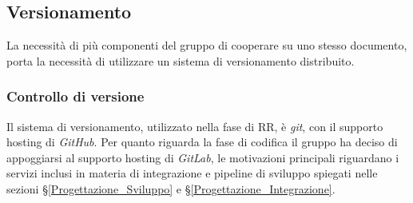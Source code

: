 

\subsection{Versionamento}\label{ProcessiSupporto_Versionamento}
La necessità di più componenti del gruppo di cooperare su uno stesso documento, porta la necessità di utilizzare un sistema di versionamento distribuito. 



\subsubsection{Controllo di versione}
Il sistema di versionamento, utilizzato nella fase di RR, è \textit{git}, con il supporto hosting di \textit{GitHub}. Per quanto riguarda la fase di codifica il gruppo ha deciso di appoggiarsi al supporto hosting di \textit{GitLab}, le motivazioni principali riguardano i servizi inclusi in materia di integrazione e pipeline di sviluppo spiegati nelle sezioni §\ref{Progettazione_Sviluppo} e §\ref{Progettazione_Integrazione}.


